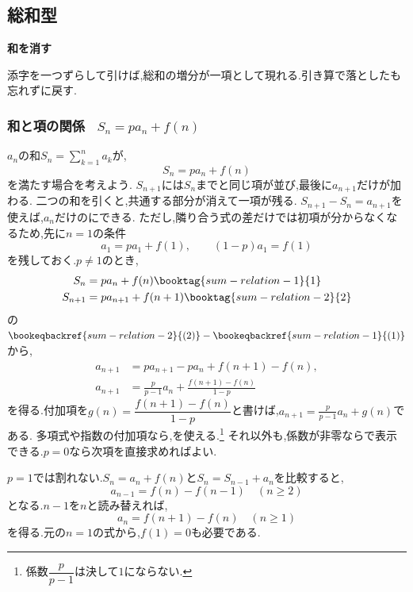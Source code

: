 
\subsection{総和型}\label{節：総和型}
  \begin{bookpoint}
    \textbf{和を消す}\par
    添字を一つずらして引けば,総和の増分が一項として現れる.引き算で落としたも忘れずに戻す.
  \end{bookpoint}
  \subsubsection{\texorpdfstring{和と項の関係 \, $S_n=pa_n+f(n)$}{和と項の関係}}
    $a_n$の和$S_n=\sum_{k=1}^n a_k$が,
    \[
      S_n=pa_n+f(n)
    \]
    を満たす場合を考えよう.
    $S_{n+1}$には$S_n$までと同じ項が並び,最後に$a_{n+1}$だけが加わる.
    二つの和を引くと,共通する部分が消えて一項が残る.
    $S_{n+1}-S_n=a_{n+1}$を使えば,$a_n$だけのにできる.
    ただし,隣り合う式の差だけでは初項が分からなくなるため,先に$n=1$の条件
    \[
      a_1=pa_1+f(1),\qquad (1-p)a_1=f(1)
    \]
    を残しておく.$p\ne1$のとき,
    \begin{align*}
      S_n&=pa_n+f(n) \booktag{sum-relation-1}{1}\\
      S_{n+1}&=pa_{n+1}+f(n+1) \booktag{sum-relation-2}{2}
    \end{align*}
    の$\bookeqbackref{sum-relation-2}{(2)}-\bookeqbackref{sum-relation-1}{(1)}$から,
    \begin{align*}
      a_{n+1}&=pa_{n+1}-pa_n+f(n+1)-f(n),\\
      a_{n+1}&=\frac p{p-1}a_n+\frac{f(n+1)-f(n)}{1-p}
    \end{align*}
    を得る.付加項を$g(n)=\dfrac{f(n+1)-f(n)}{1-p}$と書けば,$a_{n+1}=\frac p{p-1}a_n+g(n)$である.
    多項式や指数の付加項なら,を使える.\footnote{係数$\dfrac{p}{p-1}$は決して$1$にならない.}
    それ以外も,係数が非零ならで表示できる.$p=0$なら次項を直接求めればよい.

    $p=1$では割れない.$S_n=a_n+f(n)$と$S_n=S_{n-1}+a_n$を比較すると,
    \[
      a_{n-1}=f(n)-f(n-1)\quad(n\ge2)
    \]
    となる.$n-1$を$n$と読み替えれば,
    \[
      a_n=f(n+1)-f(n)\quad(n\ge1)
    \]
    を得る.元の$n=1$の式から,$f(1)=0$も必要である.

